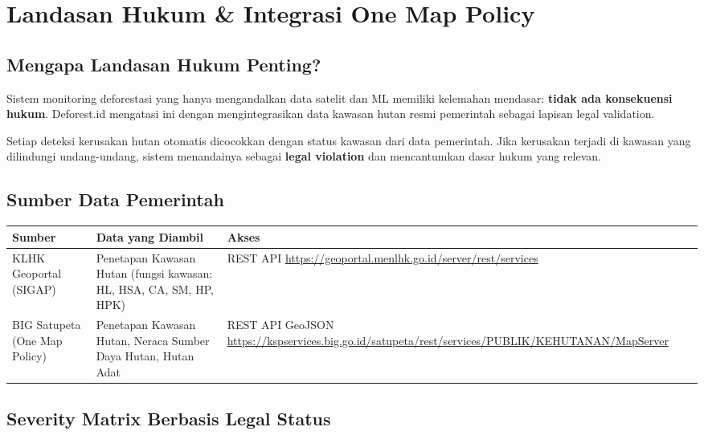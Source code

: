 \documentclass[11pt,a4paper]{article}
\begin{document}
\section{Landasan Hukum \& Integrasi One Map Policy}

\subsection{Mengapa Landasan Hukum Penting?}

Sistem monitoring deforestasi yang hanya mengandalkan data satelit dan ML memiliki kelemahan mendasar: \textbf{ tidak ada konsekuensi hukum}. Deforest.id mengatasi ini dengan mengintegrasikan data kawasan hutan resmi pemerintah sebagai lapisan legal validation.

Setiap deteksi kerusakan hutan otomatis dicocokkan dengan status kawasan dari data pemerintah. Jika kerusakan terjadi di kawasan yang dilindungi undang-undang, sistem menandainya sebagai \textbf{legal violation} dan mencantumkan dasar hukum yang relevan.

\subsection{Sumber Data Pemerintah}

\begin{longtable}{p{3.5cm} p{4cm} p{6cm}}
    \toprule
    \textbf{Sumber} & \textbf{Data yang Diambil} & \textbf{Akses} \\
    \midrule
    \endhead
    \bottomrule
    \endlastfoot

    KLHK Geoportal (SIGAP)
    & Penetapan Kawasan Hutan (fungsi kawasan: HL, HSA, CA, SM, HP, HPK)
    & REST API \newline \url{https://geoportal.menlhk.go.id/server/rest/services} \\

    BIG Satupeta (One Map Policy)
    & Penetapan Kawasan Hutan, Neraca Sumber Daya Hutan, Hutan Adat
    & REST API GeoJSON \newline \url{https://kspservices.big.go.id/satupeta/rest/services/PUBLIK/KEHUTANAN/MapServer} \\

\end{longtable}

\subsection{Severity Matrix Berbasis Legal Status}
\end{document}
